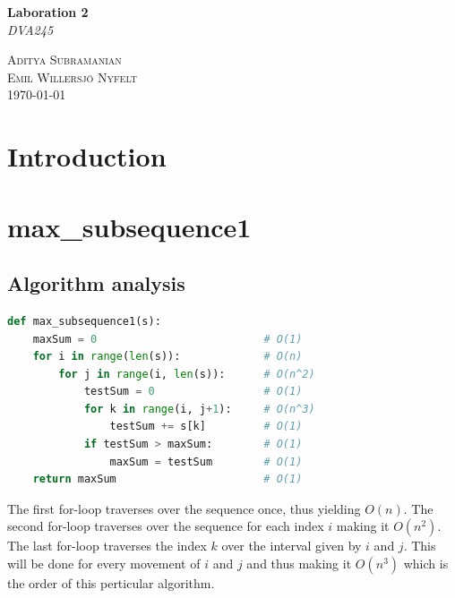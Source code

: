 \documentclass[12pt]{article}
\begin{document}
\begin{titlepage}	
	\begin{center}	
		\Large{\textbf{Laboration 2}} \\
		[0.3 in]
		\large{\textit{DVA245}} \\
		[4.1 in]
	\end{center}

	\vspace{2in}
		
	\begin{flushright}
		\textsc{\large Aditya Subramanian} \\
		\textsc{\large Emil Willersjö Nyfelt} \\
		\today \\
	\end{flushright}
\end{titlepage}

\newpage
\section{Introduction}
\newpage
\section{max\_subsequence1}
\subsection{Algorithm analysis}
\begin{lstlisting}[language=Python]
def max_subsequence1(s):
    maxSum = 0                          # O(1)
    for i in range(len(s)):             # O(n)
        for j in range(i, len(s)):      # O(n^2)
            testSum = 0                 # O(1)
            for k in range(i, j+1):     # O(n^3)
                testSum += s[k]         # O(1)
            if testSum > maxSum:        # O(1)
                maxSum = testSum        # O(1)
    return maxSum                       # O(1)
\end{lstlisting}
The first for-loop traverses over the sequence once, thus yielding $O(n)$. The second for-loop  traverses over the sequence for each index $i$ making it $O(n^2)$. The last for-loop traverses the index $k$ over the interval given by $i$ and $j$. This will be done for every movement of $i$ and $j$ and thus making it $O(n^3)$ which is the order of this perticular algorithm. 
\end{document}

